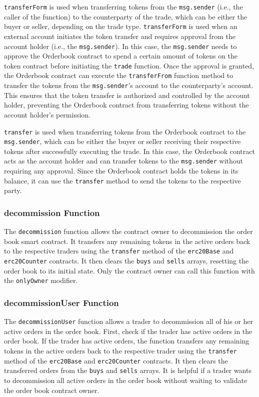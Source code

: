 \texttt{transferForm} is used when transferring tokens from the \texttt{msg.sender} (i.e.,
the caller of the function) to the counterparty of the trade, which can be either the buyer or seller, depending on the trade type.
\texttt{transferForm} is used when an external account initiates the token transfer and requires approval from
the account holder (i.e., the \texttt{msg.sender}). In this case, the \texttt{msg.sender} needs to approve the Orderbook contract to spend a certain amount of tokens
on the token contract before initiating the \texttt{trade} function. Once the approval is granted, the Orderbook contract can execute the \texttt{transferFrom} function
method to transfer the tokens from the \texttt{msg.sender}'s account to the counterparty's account. This ensures that the token transfer is authorized and
controlled by the account holder, preventing the Orderbook contract from transferring tokens without the account holder's permission.


\texttt{transfer} is used when transferring tokens from the Orderbook contract to the \texttt{msg.sender}, which can be either the buyer or seller receiving
their respective tokens after successfully executing the trade. In this case, the Orderbook contract acts as the account holder and can transfer tokens to the
\texttt{msg.sender} without requiring any approval. Since the Orderbook contract holds the tokens in its balance, it can use the \texttt{transfer} method to
send the tokens to the respective party.

\subsubsection{decommission Function}


The \texttt{decommission} function allows the contract owner to decommission the order book smart contract. It transfers any remaining tokens in the active
orders back to the respective traders using the \texttt{transfer} method of the \texttt{erc20Base} and \texttt{erc20Counter} contracts. It then clears
the \texttt{buys} and \texttt{sells} arrays, resetting the order book to its initial state. Only the contract owner can call this function with the
\texttt{onlyOwner} modifier.


\subsubsection{decommissionUser Function}


The \texttt{decommissionUser} function allows a trader to decommission all of his or her active orders in the order book. First, check if the trader has active orders in the order book.
If the trader has active orders, the function transfers any remaining tokens in the active orders back to the respective trader using the \texttt{transfer} method
of the \texttt{erc20Base} and \texttt{erc20Counter} contracts. It then clears the transferred orders from the \texttt{buys} and \texttt{sells} arrays. It is helpful
if a trader wants to decommission all active orders in the order book without waiting to validate the order book contract owner.


